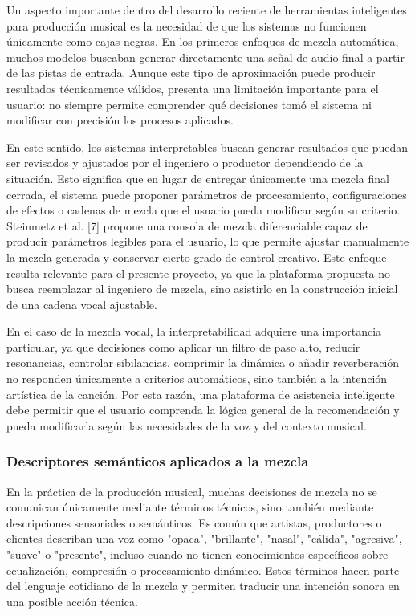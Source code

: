 Un aspecto importante dentro del desarrollo reciente de herramientas inteligentes para producción musical es la necesidad de que los sistemas no funcionen únicamente como cajas negras. En los primeros enfoques de mezcla automática, muchos modelos buscaban generar directamente una señal de audio final a partir de las pistas de entrada. Aunque este tipo de aproximación puede producir resultados técnicamente válidos, presenta una limitación importante para el usuario: no siempre permite comprender qué decisiones tomó el sistema ni modificar con precisión los procesos aplicados.

En este sentido, los sistemas interpretables buscan generar resultados que puedan ser revisados y ajustados por el ingeniero o productor dependiendo de la situación. Esto significa que en lugar de entregar únicamente una mezcla final cerrada, el sistema puede proponer parámetros de procesamiento, configuraciones de efectos o cadenas de mezcla que el usuario pueda modificar según su criterio. Steinmetz et al. [7] propone una consola de mezcla diferenciable capaz de producir parámetros legibles para el usuario, lo que permite ajustar manualmente la mezcla generada y conservar cierto grado de control creativo. Este enfoque resulta relevante para el presente proyecto, ya que la plataforma propuesta no busca reemplazar al ingeniero de mezcla, sino asistirlo en la construcción inicial de una cadena vocal ajustable.

En el caso de la mezcla vocal, la interpretabilidad adquiere una importancia particular, ya que decisiones como aplicar un filtro de paso alto, reducir resonancias, controlar sibilancias, comprimir la dinámica o añadir reverberación no responden únicamente a criterios automáticos, sino también a la intención artística de la canción. Por esta razón, una plataforma de asistencia inteligente debe permitir que el usuario comprenda la lógica general de la recomendación y pueda modificarla según las necesidades de la voz y del contexto musical.

\subsubsection*{Descriptores semánticos aplicados a la mezcla}

En la práctica de la producción musical, muchas decisiones de mezcla no se comunican únicamente mediante términos técnicos, sino también mediante descripciones sensoriales o semánticos. Es común que artistas, productores o clientes describan una voz como "opaca", "brillante", "nasal", "cálida", "agresiva", "suave" o "presente", incluso cuando no tienen conocimientos específicos sobre ecualización, compresión o procesamiento dinámico. Estos términos hacen parte del lenguaje cotidiano de la mezcla y permiten traducir una intención sonora en una posible acción técnica.

